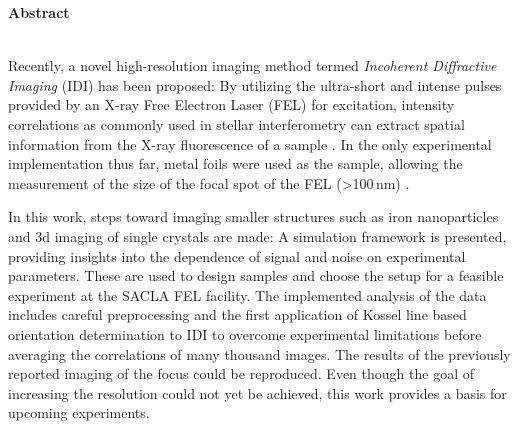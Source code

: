 	\begin{Huge}
		\textbf{Abstract}\vspace{12mm}
	\end{Huge}
\\
Recently, a novel high-resolution imaging method termed \textit{Incoherent Diffractive Imaging} (IDI) has been proposed: By utilizing the ultra-short and intense pulses provided by an X-ray Free Electron Laser (FEL) for excitation,  intensity correlations as commonly used in stellar interferometry can extract spatial information from the X-ray fluorescence of a sample \cite{classen2017}.
In the only experimental implementation thus far, metal foils were used as the sample, allowing the measurement of the size of the focal spot of the FEL (>100\,nm) \cite{nakumura2020}.

In this work, steps toward imaging smaller structures such as iron nanoparticles and 3d imaging of single crystals are made: A simulation framework is presented, providing insights into the dependence of signal and noise on experimental parameters. These are used to design samples and choose the setup for a feasible experiment at the SACLA FEL facility. The implemented analysis of the data includes careful preprocessing and the first application of Kossel line based orientation determination to IDI to overcome experimental limitations before averaging the correlations of many thousand images. The results of the previously reported imaging of the focus could be reproduced. 
Even though the goal of increasing the resolution could not yet be achieved, this work provides a basis for upcoming experiments.

 \vspace{1cm}
 
